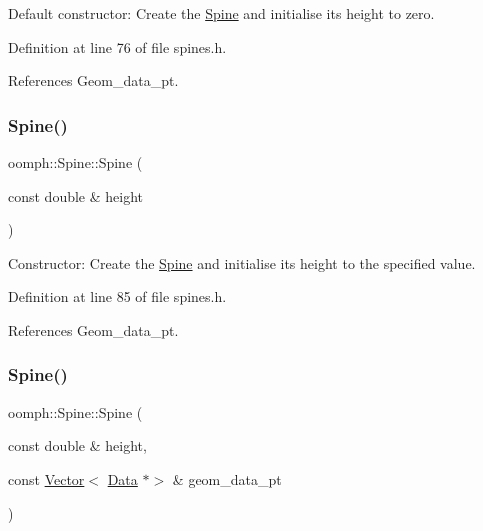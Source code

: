 Default constructor\+: Create the \hyperlink{classoomph_1_1Spine}{Spine} and initialise its height to zero. 



Definition at line 76 of file spines.\+h.



References Geom\+\_\+data\+\_\+pt.

\mbox{\label{classoomph_1_1Spine_a7a8e8d3030dabfc977e978ceb1363c3b}} 
\subsubsection{\texorpdfstring{Spine()}{Spine()}\hspace{0.1cm}{\footnotesize\ttfamily [2/4]}}
{\footnotesize\ttfamily oomph\+::\+Spine\+::\+Spine (\begin{DoxyParamCaption}\item[{const double \&}]{height }\end{DoxyParamCaption})\hspace{0.3cm}{\ttfamily [inline]}}



Constructor\+: Create the \hyperlink{classoomph_1_1Spine}{Spine} and initialise its height to the specified value. 



Definition at line 85 of file spines.\+h.



References Geom\+\_\+data\+\_\+pt.

\mbox{\label{classoomph_1_1Spine_a2da64547ad53a6c00ab06f0217bcb397}} 
\subsubsection{\texorpdfstring{Spine()}{Spine()}\hspace{0.1cm}{\footnotesize\ttfamily [3/4]}}
{\footnotesize\ttfamily oomph\+::\+Spine\+::\+Spine (\begin{DoxyParamCaption}\item[{const double \&}]{height,  }\item[{const \hyperlink{classoomph_1_1Vector}{Vector}$<$ \hyperlink{classoomph_1_1Data}{Data} $\ast$$>$ \&}]{geom\+\_\+data\+\_\+pt }\end{DoxyParamCaption})\hspace{0.3cm}{\ttfamily [inline]}}



